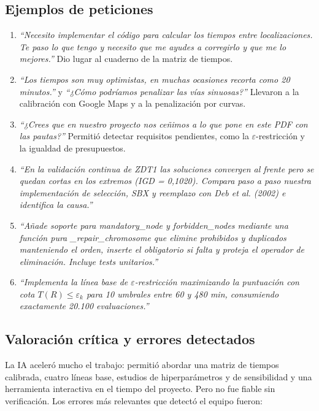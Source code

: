 \subsection{Ejemplos de peticiones}

\begin{enumerate}
  \item \emph{``Necesito implementar el código para calcular los tiempos entre localizaciones. Te paso lo que tengo y necesito que me ayudes a corregirlo y que me lo mejores.''} Dio lugar al cuaderno de la matriz de tiempos.
  \item \emph{``Los tiempos son muy optimistas, en muchas ocasiones recorta como 20 minutos.''} y \emph{``¿Cómo podríamos penalizar las vías sinuosas?''} Llevaron a la calibración con Google Maps y a la penalización por curvas.
  \item \emph{``¿Crees que en nuestro proyecto nos ceñimos a lo que pone en este PDF con las pautas?''} Permitió detectar requisitos pendientes, como la $\varepsilon$-restricción y la igualdad de presupuestos.
  \item \emph{``En la validación continua de ZDT1 las soluciones convergen al frente pero se quedan cortas en los extremos (IGD = 0,1020). Compara paso a paso nuestra implementación de selección, SBX y reemplazo con Deb et al. (2002) e identifica la causa.''}
  \item \emph{``Añade soporte para mandatory\_node y forbidden\_nodes mediante una función pura \_repair\_chromosome que elimine prohibidos y duplicados manteniendo el orden, inserte el obligatorio si falta y proteja el operador de eliminación. Incluye tests unitarios.''}
  \item \emph{``Implementa la línea base de $\varepsilon$-restricción maximizando la puntuación con cota $T(R) \le \varepsilon_k$ para 10 umbrales entre 60 y 480 min, consumiendo exactamente 20.100 evaluaciones.''}
\end{enumerate}

\subsection{Valoración crítica y errores detectados}

La IA aceleró mucho el trabajo: permitió abordar una matriz de tiempos calibrada, cuatro líneas base, estudios de hiperparámetros y de sensibilidad y una herramienta interactiva en el tiempo del proyecto. Pero no fue fiable sin verificación. Los errores más relevantes que detectó el equipo fueron:


